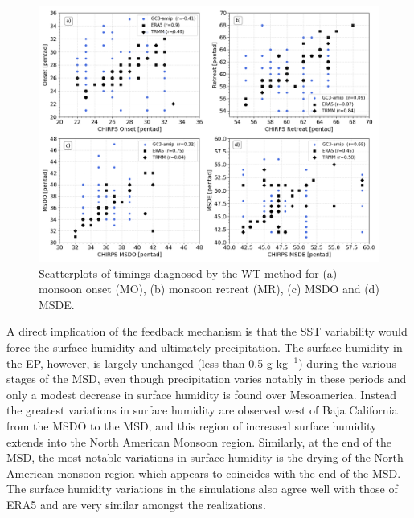 \begin{figure}[t!]
\includegraphics[width=\linewidth]{figures/master_sst_scatter.png}
\caption{Scatterplots of timings diagnosed by the WT method for (a) monsoon onset (MO), (b) monsoon retreat (MR), (c) MSDO and (d) MSDE. }
\label{fig:amipsstscatter}
\end{figure}

A direct implication of the feedback mechanism is that the SST variability would force the surface humidity and ultimately precipitation. The surface humidity in the EP, however, is largely unchanged (less than 0.5 g kg$^{-1}$) during the various stages of the MSD, even though precipitation varies notably in these periods and only a modest decrease in surface humidity is found over Mesoamerica. Instead the greatest variations in surface humidity are observed west of Baja California from the MSDO to the MSD, and this region of increased surface humidity extends into the North American Monsoon region. Similarly, at the end of the MSD, the most notable variations in surface humidity is the drying of the North American monsoon region which appears to coincides with the end of the MSD.
 The surface humidity variations in the simulations also agree well with those of ERA5 and are very similar amongst the realizations.


